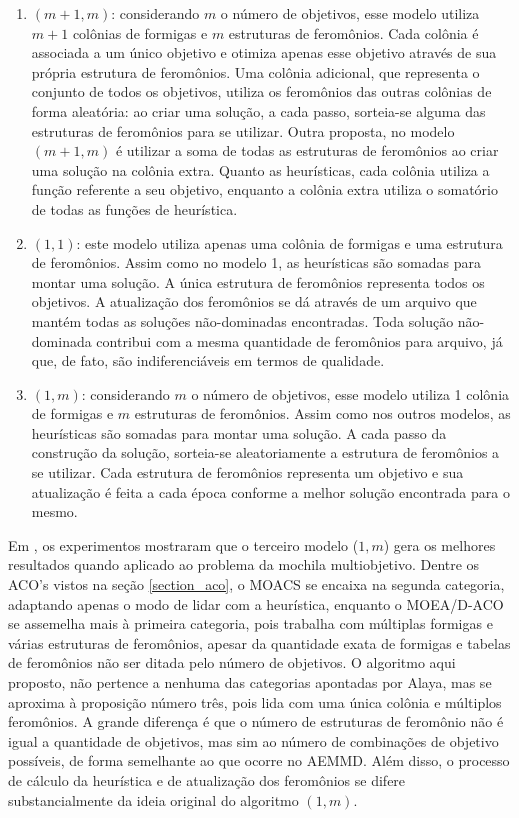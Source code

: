 \begin{enumerate}
	\item $(m+1, m)$: considerando $m$ o número de objetivos, esse modelo utiliza $m + 1$ colônias de formigas e $m$ estruturas de feromônios. Cada colônia é associada a um único objetivo e otimiza apenas esse objetivo através de sua própria estrutura de feromônios. Uma colônia adicional, que representa o conjunto de todos os objetivos, utiliza os feromônios das outras colônias de forma aleatória: ao criar uma solução, a cada passo, sorteia-se alguma das estruturas de feromônios para se utilizar. Outra proposta, no modelo $(m+1, m)$ é utilizar a soma de todas as estruturas de feromônios ao criar uma solução na colônia extra. Quanto as heurísticas, cada colônia utiliza a função referente a seu objetivo, enquanto a colônia extra utiliza o somatório de todas as funções de heurística.
	\item $(1,1)$: este modelo utiliza apenas uma colônia de formigas e uma estrutura de feromônios. Assim como no modelo 1, as heurísticas são somadas para montar uma solução. A única estrutura de feromônios representa todos os objetivos. A atualização dos feromônios se dá através de um arquivo que mantém todas as soluções não-dominadas encontradas. Toda solução não-dominada contribui com a mesma quantidade de feromônios para arquivo, já que, de fato, são indiferenciáveis em termos de qualidade.
	\item $(1,m)$: considerando $m$ o número de objetivos, esse modelo utiliza 1 colônia de formigas e $m$ estruturas de feromônios. Assim como nos outros modelos, as heurísticas são somadas para montar uma solução. A cada passo da construção da solução, sorteia-se aleatoriamente a estrutura de feromônios a se utilizar. Cada estrutura de feromônios representa um objetivo e sua atualização é feita a cada época conforme a melhor solução encontrada para o mesmo.
\end{enumerate}

Em \cite{Alaya2007}, os experimentos mostraram que o terceiro modelo ($1,m$) gera os melhores resultados quando aplicado ao problema da mochila multiobjetivo. Dentre os ACO's vistos na seção \ref{section_aco}, o MOACS se encaixa na segunda categoria, adaptando apenas o modo de lidar com a heurística, enquanto o MOEA/D-ACO se assemelha mais à primeira categoria, pois trabalha com múltiplas formigas e várias estruturas de feromônios, apesar da quantidade exata de formigas e tabelas de feromônios não ser ditada pelo número de objetivos. O algoritmo aqui proposto, não pertence a nenhuma das categorias apontadas por Alaya, mas se aproxima à proposição número três, pois lida com uma única colônia e múltiplos feromônios. A grande diferença é que o número de estruturas de feromônio não é igual a quantidade de objetivos, mas sim ao número de combinações de objetivo possíveis, de forma semelhante ao que ocorre no AEMMD. Além disso, o processo de cálculo da heurística e de atualização dos feromônios se difere substancialmente da ideia original do algoritmo $(1,m)$.

